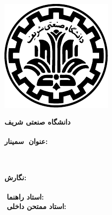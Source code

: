 \begin{center}
\thispagestyle{empty}
\includegraphics{logo} \\
\vskip 1cm

‎\textbf{‎دانشگاه صنعتی شریف}\\
‎\textbf{‎\fadepart}\\ 
‎\textbf{سمینار \falevel \famajor}‎
\vskip 1cm
‎\textbf{‎\large{عنوان:}}\\ \textbf{\fatitle}\\\textbf{‎\lr{\entitle}}

\vskip 1cm
‎\textbf{نگارش:}‎\\ ‎\textbf{\faAuthor}‎\\ ‎\textbf{\stdnum}‎
\vskip 1cm
‎\textbf{استاد راهنما:}‎\\ ‎\textbf{\fasupervisor}‎
\vskip 1cm
‎\textbf{‎استاد ممتحن داخلی:}\\ ‎\textbf{\momtahenin}
\vskip 4cm
‎‎\fadate
\end{center}

